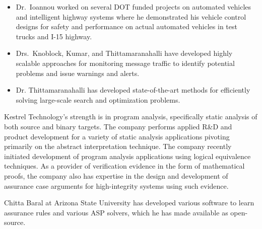 \documentclass[12pt]{dod-blank}
\begin{document}
\begin{itemize}[itemsep=0pt,leftmargin=*]
\item Dr.\ Ioannou %
worked on several DOT funded projects on automated vehicles and intelligent highway systems where he demonstrated his vehicle control designs for safety and performance on actual automated vehicles in test trucks and I-15 highway.
\item Drs.\ Knoblock, Kumar, and Thittamaranahalli have developed highly scalable approaches for monitoring message traffic to identify potential problems and issue warnings and alerts. 
\item Dr. Thittamaranahalli has developed state-of-the-art methods for efficiently solving large-scale search and optimization problems. %

\end{itemize}

Kestrel Technology's strength is in program analysis, specifically static analysis of both source and binary targets.  The company performs applied R\&D and product development for a variety of static analysis applications  pivoting primarily on the abstract interpretation technique.  The company recently initiated development of program analysis applications using logical equivalence techniques. As a provider of verification evidence in the form of mathematical proofs, the company also has expertise in the design and development of assurance case arguments for high-integrity systems using such evidence. %

   

Chitta Baral at Arizona State University has developed various software to learn assurance rules and various ASP solvers, which he has made available as open-source.
\end{document}
